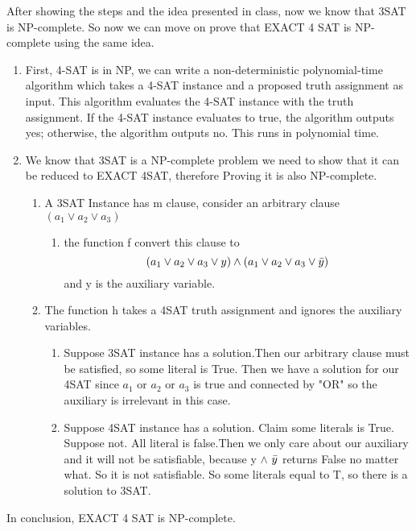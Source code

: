 \documentclass{article}
\begin{document}
After showing the steps and the idea presented in class, now we know that 3SAT is NP-complete. So now we can move on prove that EXACT 4 SAT is NP-complete using the same idea. 

\begin{enumerate}
    \item First, 4-SAT is in NP, we can write a non-deterministic polynomial-time algorithm which takes a 4-SAT instance and a proposed truth assignment as
input. This algorithm evaluates the 4-SAT instance with the truth assignment. If the 4-SAT instance evaluates to true, the algorithm outputs yes;
otherwise, the algorithm outputs no. This runs in polynomial time.
\item We know that 3SAT is a NP-complete problem we need to show that it can be reduced to EXACT 4SAT, therefore Proving it is also NP-complete. 
\begin{enumerate}
    \item A 3SAT Instance has m clause, consider an arbitrary clause $(a_1 \vee a_2 \vee a_3)$
    \begin{enumerate}
        \item the function f convert this clause to 
        $$(a_1 \vee a_2 \vee a_3 \vee y) \wedge(a_1 \vee a_2 \vee a_3 \vee \Bar{y})$$
        and y is the auxiliary variable. 
    \end{enumerate}
    \item The function h takes a 4SAT truth assignment and ignores the auxiliary variables.
    \begin{enumerate}
        \item Suppose 3SAT instance has a solution.Then our arbitrary clause must be satisfied, so some literal is True. Then we have a solution for our 4SAT since $a_1$ or $a_2$ or $a_3$ is true and connected by "OR" so the auxiliary is irrelevant in this case. 
        \item Suppose 4SAT instance has a solution. Claim some literals is True. Suppose not. All literal is false.Then we only care about our auxiliary and it will not be satisfiable, because y $\wedge$ $\Bar{y}$ returns False no matter what. So it is not satisfiable. So some literals equal to T, so there is a solution to 3SAT.
        \end{enumerate}
\end{enumerate}
\end{enumerate}
In conclusion, EXACT 4 SAT is NP-complete.
\newpage
\end{document}
